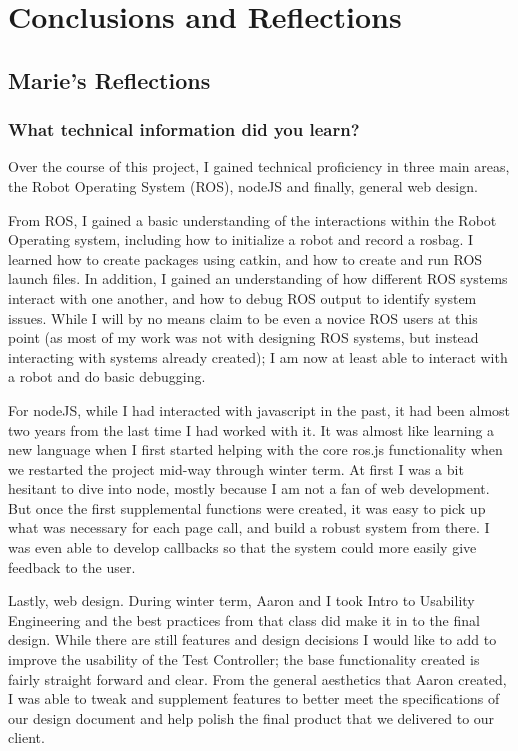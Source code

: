 \documentclass[onecolumn, draftclsnofoot,10pt, compsoc]{report}
\begin{document}
\chapter{Conclusions and Reflections}
\minitoc
\section{Marie's Reflections}
\subsection{What technical information did you learn?}
Over the course of this project, I gained technical proficiency in three main areas, the Robot Operating System (ROS), nodeJS and finally, general web design. 

From ROS, I gained a basic understanding of the interactions within the Robot Operating system, including how to initialize a robot and record a rosbag. I learned how to create packages using catkin, and how to create and run ROS launch files. In addition, I gained an understanding of how different ROS systems interact with one another, and how to debug ROS output to identify system issues. While I will by no means claim to be even a novice ROS users at this point (as most of my work was not with designing ROS systems, but instead interacting with systems already created); I am now at least able to interact with a robot and do basic debugging. 

For nodeJS, while I had interacted with javascript in the past, it had been almost two years from the last time I had worked with it. It was almost like learning a new language when I first started helping with the core ros.js functionality when we restarted the project mid-way through winter term. At first I was a bit hesitant to dive into node, mostly because I am not a fan of web development. But once the first supplemental functions were created, it was easy to pick up what was necessary for each page call, and build a robust system from there. I was even able to develop callbacks so that the system could more easily give feedback to the user. 

Lastly, web design. During winter term, Aaron and I took Intro to Usability Engineering and the best practices from that class did make it in to the final design. While there are still features and design decisions I would like to add to improve the usability of the Test Controller; the base functionality created is fairly straight forward and clear. From the general aesthetics that Aaron created, I was able to tweak and supplement features to better meet the specifications of our design document and help polish the final product that we delivered to our client. 
\end{document}
